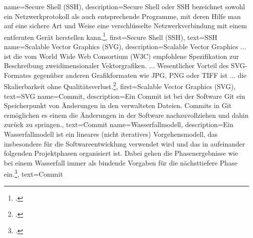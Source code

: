 {
    name={Secure Shell (SSH)},
    description={Secure Shell oder SSH bezeichnet sowohl ein Netzwerkprotokoll
      als auch entsprechende Programme, mit deren Hilfe man auf eine sichere Art und
      Weise eine verschlüsselte Netzwerkverbindung mit einem entfernten Gerät
      herstellen kann.\footcite{ssh}},
    first={Secure Shell (SSH)},
    text={SSH}
}
{
    name={Scalable Vector Graphics (SVG)},
    description={Scalable Vector Graphics ... ist die vom World Wide Web
      Consortium (W3C) empfohlene Spezifikation zur Beschreibung
      zweidimensionaler Vektorgrafiken. ... Wesentlicher Vorteil des
      SVG-Formates gegenüber anderen Grafikformaten wie JPG, PNG oder TIFF ist
      ... die Skalierbarkeit ohne Qualitätsverlust.\footcite{svg}},
    first={Scalable Vector Graphics (SVG)},
    text={SVG}
}
{
    name={Commit},
    description={Ein Commit ist bei der Software Git ein Speicherpunkt von
      Änderungen in den verwalteten Dateien. Commits in Git ermöglichen es
      einem die Änderungen in der Software nachzuvollziehen und dahin zurück zu
      springen.},
    text={Commit}
}
{
    name={Wasserfallmodell},
    description={Ein Wasserfallmodell ist ein lineares (nicht iteratives)
      Vorgehensmodell, das insbesondere für die Softwareentwicklung verwendet wird
      und das in aufeinander folgenden Projektphasen organisiert ist. Dabei gehen die
      Phasenergebnisse wie bei einem Wasserfall immer als bindende Vorgaben für die
      nächsttiefere Phase ein.\footcite{wasserfall}},
    text={Commit}
}
